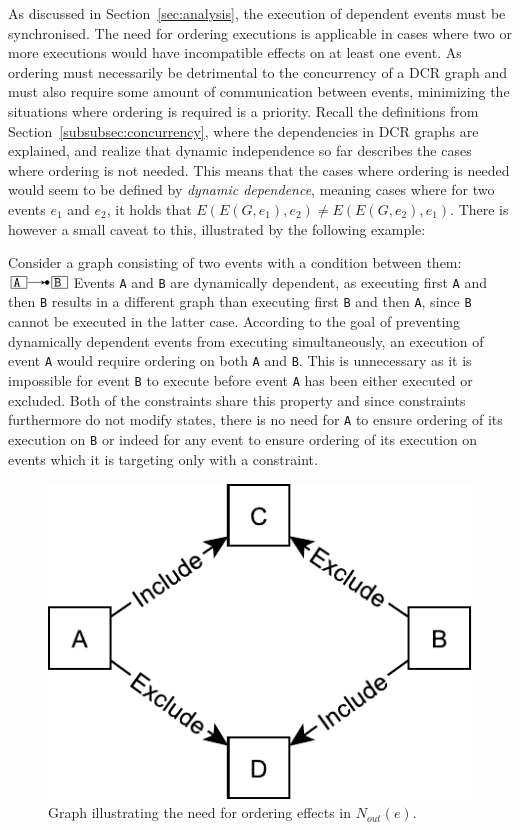 \documentclass{article}
\begin{document}
	As discussed in Section~\ref{sec:analysis}, the execution of dependent events must be synchronised.
	The need for ordering executions is applicable in cases where two or more executions would have incompatible effects on at least one event.
	As ordering must necessarily be detrimental to the concurrency of a DCR graph and must also require some amount of communication between events, minimizing the situations where ordering is required is a priority.
	Recall the definitions from Section~\ref{subsubsec:concurrency}, where the dependencies in DCR graphs are explained, and realize that dynamic independence so far describes the cases where ordering is not needed.
	This means that the cases where ordering is needed would seem to be defined by \textit{dynamic dependence}, meaning cases where for two events $e_1$ and $e_2$, it holds that $E(E(G, e_1),e_2) \neq E(E(G, e_2),e_1)$.
	There is however a small caveat to this, illustrated by the following example:

	Consider a graph consisting of two events with a condition between them: $\ev{A} \crel \ev{B}$
	Events \texttt{A} and \texttt{B} are dynamically dependent, as executing first \texttt{A} and then \texttt{B} results in a different graph than executing first \texttt{B} and then \texttt{A}, since \texttt{B} cannot be executed in the latter case.
	According to the goal of preventing dynamically dependent events from executing simultaneously, an execution of event \texttt{A} would require ordering on both \texttt{A} and \texttt{B}.
	This is unnecessary as it is impossible for event \texttt{B} to execute before event \texttt{A} has been either executed or excluded.
	Both of the constraints share this property and since constraints furthermore do not modify states, there is no need for \texttt{A} to ensure ordering of its execution on \texttt{B} or indeed for any event to ensure ordering of its execution on events which it is targeting only with a constraint.

	\begin{figure}[ht]
		\center
		\includegraphics[scale=0.5]{figures/dcr-graphs/race-condition.pdf}
		\caption{Graph illustrating the need for ordering effects in $N_{out}(e)$.}
		\label{fig:race-condition}
	\end{figure}
	\FloatBarrier
\end{document}
